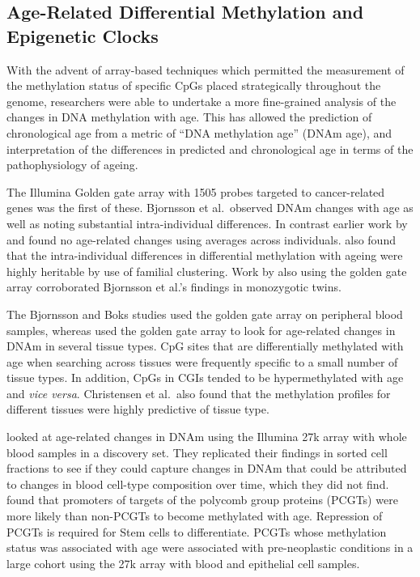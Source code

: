 \documentclass[
]{book}
\begin{document}
\hypertarget{DNAmAgeReview}{%
\subsection{Age-Related Differential Methylation and Epigenetic Clocks}\label{DNAmAgeReview}}

With the advent of array-based techniques which permitted the measurement of the methylation status of specific CpGs placed strategically throughout the genome, researchers were able to undertake a more fine-grained analysis of the changes in DNA methylation with age. This has allowed the prediction of chronological age from a metric of ``DNA methylation age'' (DNAm age), and interpretation of the differences in predicted and chronological age in terms of the pathophysiology of ageing.

The Illumina Golden gate array \citep{Bibikova2006} with 1505 probes targeted to cancer-related genes was the first of these. Bjornsson et al.~observed DNAm changes with age as well as noting substantial intra-individual differences. In contrast earlier work by \citet{Eckhardt2006} and \citet{Ehrlich1982} found no age-related changes using averages across individuals. \citet{Bjornsson2008} also found that the intra-individual differences in differential methylation with ageing were highly heritable by use of familial clustering. Work by \citet{Boks2009} also using the golden gate array corroborated Bjornsson et al.'s findings in monozygotic twins.

The Bjornsson and Boks studies used the golden gate array on peripheral blood samples, whereas \citet{Christensen2009} used the golden gate array to look for age-related changes in DNAm in several tissue types. CpG sites that are differentially methylated with age when searching across tissues were frequently specific to a small number of tissue types. In addition, CpGs in CGIs tended to be hypermethylated with age and \emph{vice versa}. Christensen et al.~also found that the methylation profiles for different tissues were highly predictive of tissue type.

\citet{Rakyan2010} looked at age-related changes in DNAm using the Illumina 27k array \citep{Bibikova2009} with whole blood samples in a discovery set. They replicated their findings in sorted cell fractions to see if they could capture changes in DNAm that could be attributed to changes in blood cell-type composition over time, which they did not find. \citet{Teschendorff2010} found that promoters of targets of the polycomb group proteins (PCGTs) were more likely than non-PCGTs to become methylated with age. Repression of PCGTs is required for Stem cells to differentiate. PCGTs whose methylation status was associated with age were associated with pre-neoplastic conditions in a large cohort using the 27k array with blood and epithelial cell samples.
\end{document}
